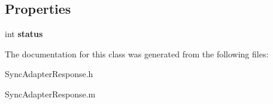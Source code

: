 \subsection*{\-Properties}
\begin{DoxyCompactItemize}
\item 
\hypertarget{interface_sync_adapter_response_a2d0aa8defd25f9e8209f4f03117989f3}{
int {\bfseries status}}
\label{interface_sync_adapter_response_a2d0aa8defd25f9e8209f4f03117989f3}

\end{DoxyCompactItemize}


\-The documentation for this class was generated from the following files\-:\begin{DoxyCompactItemize}
\item 
\-Sync\-Adapter\-Response.\-h\item 
\-Sync\-Adapter\-Response.\-m\end{DoxyCompactItemize}
